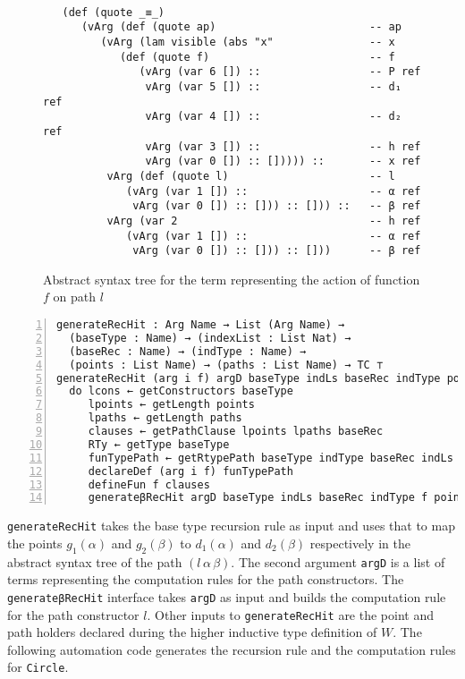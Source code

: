 \documentclass[sigplan,10pt]{acmart}
\begin{document}
\begin{figure}
\begin{center}
\begingroup
\fontsize{7pt}{9pt}\selectfont
\begin{Verbatim}[frame = single]

   (def (quote _≡_)
      (vArg (def (quote ap)                        -- ap
         (vArg (lam visible (abs "x"               -- x
            (def (quote f)                         -- f
               (vArg (var 6 []) ::                 -- P ref
                vArg (var 5 []) ::                 -- d₁ ref
                vArg (var 4 []) ::                 -- d₂ ref
                vArg (var 3 []) ::                 -- h ref
                vArg (var 0 []) :: [])))) ::       -- x ref
          vArg (def (quote l)                      -- l
             (vArg (var 1 []) ::                   -- α ref
              vArg (var 0 []) :: [])) :: [])) ::   -- β ref
          vArg (var 2                              -- h ref
             (vArg (var 1 []) ::                   -- α ref
              vArg (var 0 []) :: [])) :: []))      -- β ref

\end{Verbatim}
\endgroup
\end{center}
\caption{Abstract syntax tree for the term representing the action of function $f$ on path $l$}
\label{fig:ast-beta-f}
\end{figure}

\begin{center}
\begingroup
\fontsize{7pt}{9pt}\selectfont
\begin{Verbatim}[frame = lines, rulecolor=\color{blue}, numbers = left, numbersep = 0pt]
generateRecHit : Arg Name → List (Arg Name) →
  (baseType : Name) → (indexList : List Nat) →
  (baseRec : Name) → (indType : Name) →
  (points : List Name) → (paths : List Name) → TC ⊤
generateRecHit (arg i f) argD baseType indLs baseRec indType points paths =
  do lcons ← getConstructors baseType
     lpoints ← getLength points
     lpaths ← getLength paths
     clauses ← getPathClause lpoints lpaths baseRec
     RTy ← getType baseType
     funTypePath ← getRtypePath baseType indType baseRec indLs paths zero RTy
     declareDef (arg i f) funTypePath
     defineFun f clauses
     generateβRecHit argD baseType indLs baseRec indType f points paths
\end{Verbatim}
\endgroup
\end{center}

{\tt generateRecHit} takes the base type recursion rule as input and uses that to map the points $g_1 (\alpha)$ and $g_2 (\beta)$ to $d_1 (\alpha)$ and $d_2 (\beta)$ respectively in the abstract syntax tree of the path $(l \, \alpha \, \beta)$. The second argument {\tt argD} is a list of terms representing the computation rules for the path constructors. The {\tt generateβRecHit} interface takes {\tt argD} as input and builds the computation rule for the path constructor $l$. Other inputs to {\tt generateRecHit} are the point and path holders declared during the higher inductive type definition of $W$. The following automation code generates the recursion rule and the computation rules for {\tt Circle}.
\end{document}
